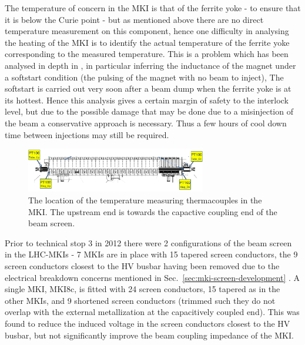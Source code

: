 The temperature of concern in the MKI is that of the ferrite yoke - to ensure that it is below the Curie point - but as mentioned above there are no direct temperature measurement on this component, hence one difficulty in analysing the heating of the MKI is to identify the actual temperature of the ferrite yoke corresponding to the measured temperature. This is a problem which has been analysed in depth in \cite{Barnes:mkiHeating}, in particular inferring the inductance of the magnet under a softstart condition (the pulsing of the magnet with no beam to inject), The softstart is carried out very soon after a beam dump when the ferrite yoke is at its hottest. Hence this analysis gives a certain margin of safety to the interlock level, but due to the possible damage that may be done due to a misinjection of the beam a conservative approach is necessary. Thus a few hours of cool down time between injections may still be required.

\begin{figure}
\begin{center}
\includegraphics[width=0.7\textwidth]{LHC_MKI/figures/pt100Loc.png}
\end{center}
\caption{The location of the temperature measuring thermacouples in the MKI. The upstream end is towards the capactive coupling end of the beam screen.}
\label{fig:mki-thermacouple-location}
\end{figure}

Prior to technical stop 3 in 2012 there were 2 configurations of the beam screen in the LHC-MKIs - 7 MKIs are in place with 15 tapered screen conductors, the 9 screen conductors closest to the HV busbar having been removed due to the electrical breakdown concerns mentioned in Sec.~\ref{sec:mki-screen-development} \cite{Barnes:improvBeamScreen}. A single MKI, MKI8c, is fitted with 24 screen conductors, 15 tapered as in the other MKIs, and 9 shortened screen conductors (trimmed such they do not overlap with the external metallization at the capacitively coupled end). This was found to reduce the induced voltage in the screen conductors closest to the HV busbar, but not significantly improve the beam coupling impedance of the MKI.